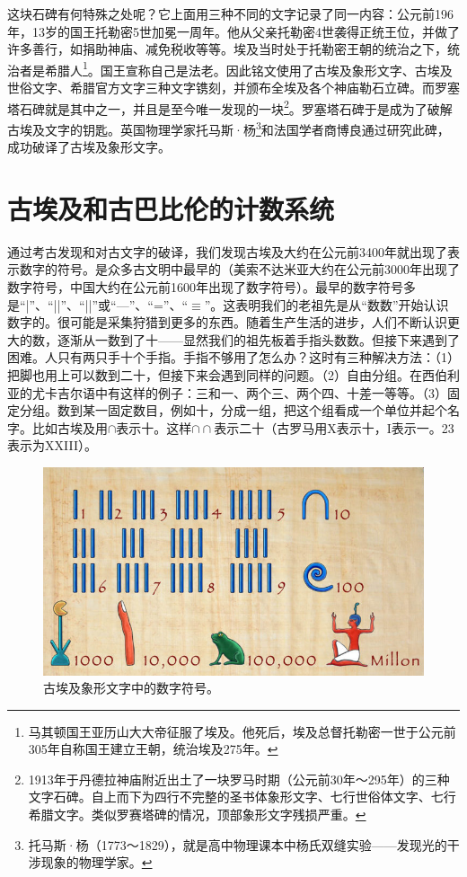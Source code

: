 \documentclass[b5paper]{ctexart}
\begin{document}
这块石碑有何特殊之处呢？它上面用三种不同的文字记录了同一内容：公元前196年，13岁的国王托勒密5世加冕一周年。他从父亲托勒密4世袭得正统王位，并做了许多善行，如捐助神庙、减免税收等等。埃及当时处于托勒密王朝的统治之下，统治者是希腊人\footnote{马其顿国王亚历山大大帝征服了埃及。他死后，埃及总督托勒密一世于公元前305年自称国王建立王朝，统治埃及275年。}。国王宣称自己是法老。因此铭文使用了古埃及象形文字、古埃及世俗文字、希腊官方文字三种文字镌刻，并颁布全埃及各个神庙勒石立碑。而罗塞塔石碑就是其中之一，并且是至今唯一发现的一块\footnote{1913年于丹德拉神庙附近出土了一块罗马时期（公元前30年～295年）的三种文字石碑。自上而下为四行不完整的圣书体象形文字、七行世俗体文字、七行希腊文字。类似罗赛塔碑的情况，顶部象形文字残损严重\cite{SH-Museum-24}。}。罗塞塔石碑于是成为了破解古埃及文字的钥匙。英国物理学家托马斯·杨\footnote{托马斯·杨（1773～1829），就是高中物理课本中杨氏双缝实验——发现光的干涉现象的物理学家。}和法国学者商博良通过研究此碑，成功破译了古埃及象形文字\cite{BM-RS-17}。

\section{古埃及和古巴比伦的计数系统}

通过考古发现和对古文字的破译，我们发现古埃及大约在公元前3400年就出现了表示数字的符号。是众多古文明中最早的（美索不达米亚大约在公元前3000年出现了数字符号，中国大约在公元前1600年出现了数字符号\cite{Clawson-1994}）。最早的数字符号多是“|”、“||”、“||”或“—”、“=”、“$\equiv$”。这表明我们的老祖先是从“数数”开始认识数字的。很可能是采集狩猎到更多的东西。随着生产生活的进步，人们不断认识更大的数，逐渐从一数到了十——显然我们的祖先板着手指头数数。但接下来遇到了困难。人只有两只手十个手指。手指不够用了怎么办？这时有三种解决方法：（1）把脚也用上可以数到二十，但接下来会遇到同样的问题。（2）自由分组。在西伯利亚的尤卡吉尔语中有这样的例子：三和一、两个三、两个四、十差一等等。（3）固定分组。数到某一固定数目，例如十，分成一组，把这个组看成一个单位并起个名字。比如古埃及用$\cap$表示十。这样$\cap \cap$表示二十（古罗马用X表示十，I表示一。23表示为XXIII）。

\begin{figure}[htbp]
 \centering
 \includegraphics[scale=0.8]{img/hieroglyphic-numbers}
 \caption{古埃及象形文字中的数字符号。}
 \label{fig:egypt-hieroglyphic-numerals}
\end{figure}
\end{document}
